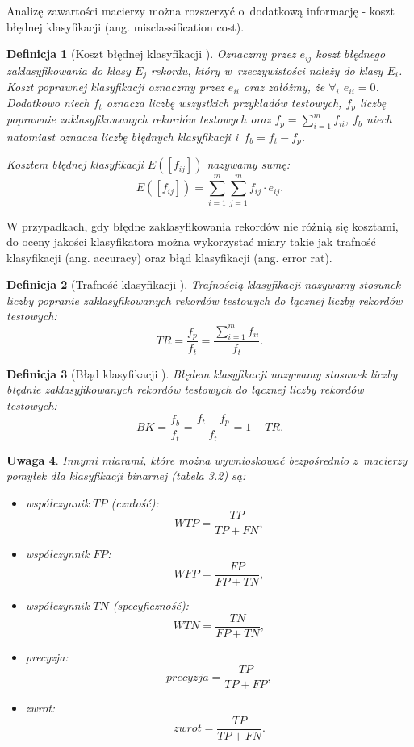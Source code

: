 \documentclass[12pt,a4paper]{report}
\newtheorem{df}{Definicja}[chapter]
\newtheorem{uwaga}[df]{Uwaga}
\begin{document}
Analizę zawartości macierzy można rozszerzyć o~dodatkową informację - koszt błędnej klasyfikacji (ang. misclassification cost).
\begin{df}[Koszt błędnej klasyfikacji {\citep[Sec 4.8.1]{edmia}}]
Oznaczmy przez $e_{ij}$ koszt błędnego zaklasyfikowania do klasy $E_j$ rekordu, który w~rzeczywistości należy do klasy $E_i$.
Koszt poprawnej klasyfikacji oznaczmy przez $e_{ii}$ oraz załóżmy, że $\forall_{i}$ $ e_{ii} = 0$.
Dodatkowo niech $f_{t}$ oznacza liczbę wszystkich przykładów testowych, $f_{p}$ liczbę poprawnie zaklasyfikowanych rekordów testowych oraz $f_{p} = \sum_{i=1}^m f_{ii}$, $f_{b}$ niech natomiast oznacza liczbę błędnych klasyfikacji i~$f_{b} = f_{t} - f_{p}$.

Kosztem błędnej klasyfikacji $E([f_{ij}])$ nazywamy sumę:
$$
E([f_{ij}]) = \sum_{i=1}^m \sum_{j=1}^m f_{ij} \cdot e_{ij}.
$$
\end{df}

W przypadkach, gdy błędne zaklasyfikowania rekordów nie różnią się kosztami, do oceny jakości klasyfikatora można wykorzystać miary takie jak trafność klasyfikacji (ang. accuracy) oraz błąd klasyfikacji (ang. error rat).
\begin{df}[Trafność klasyfikacji {\citep[Sec 4.8.1]{edmia}}]
Trafnością klasyfikacji nazywamy stosunek liczby popranie zaklasyfikowanych rekordów testowych do łącznej liczby rekordów testowych:
$$
TR= \frac{f_p}{f_t} = \frac{\sum_{i=1}^m f_{ii}}{f_t}.
$$
\end{df}
\begin{df}[Błąd klasyfikacji {\citep[Sec 4.8.1]{edmia}}]
Błędem klasyfikacji nazywamy stosunek liczby błędnie zaklasyfikowanych rekordów testowych do łącznej liczby rekordów testowych:
$$
BK = \frac{f_b}{f_t}=\frac{f_t-f_p}{f_t}=1 - TR.
$$
\end{df}
\begin{uwaga}{\citep[Sec 4.8.1]{edmia}}
Innymi miarami, które można wywnioskować bezpośrednio z~macierzy pomyłek dla klasyfikacji binarnej (tabela 3.2) są:
\begin{itemize}
\item współczynnik $TP$ (czułość):
$$
WTP = \frac{TP}{TP + FN},
$$
\item współczynnik $FP$:
$$
WFP = \frac{FP}{FP + TN},
$$
\item współczynnik $TN$ (specyficzność):
$$
WTN = \frac{TN}{FP + TN},
$$
\item precyzja:
$$
precyzja = \frac{TP}{TP + FP},
$$
\item zwrot:
$$
zwrot = \frac{TP}{TP + FN}.
$$
\end{itemize}
\end{uwaga}
\end{document}
